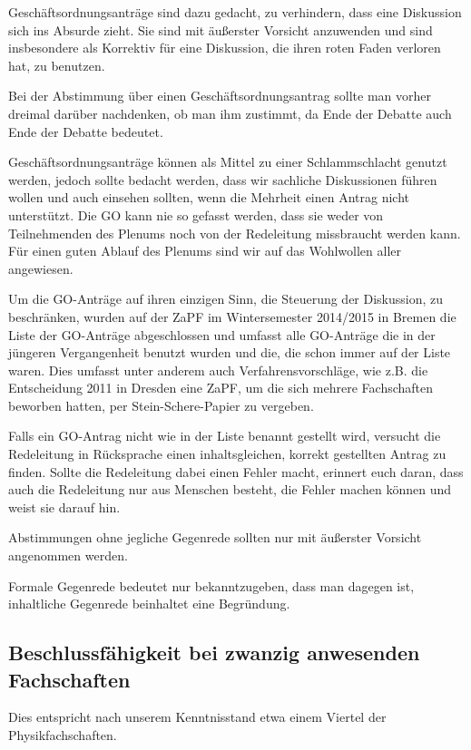 \documentclass[12pt,oneside]{scrartcl}
\begin{document}
Geschäftsordnungsanträge sind dazu gedacht, zu verhindern, dass eine Diskussion
sich ins Absurde zieht. Sie sind mit äußerster Vorsicht anzuwenden und sind
insbesondere als Korrektiv für eine Diskussion, die ihren roten Faden verloren
hat, zu benutzen.

Bei der Abstimmung über einen Geschäftsordnungsantrag sollte man vorher dreimal
darüber nachdenken, ob man ihm zustimmt, da Ende der Debatte auch Ende der Debatte
bedeutet.

Geschäftsordnungsanträge können als Mittel zu einer Schlammschlacht genutzt
werden, jedoch sollte bedacht werden, dass wir sachliche Diskussionen führen
wollen und auch einsehen sollten, wenn die Mehrheit einen Antrag nicht
unterstützt. Die GO kann nie so gefasst werden, dass sie weder von Teilnehmenden
des Plenums noch von der Redeleitung missbraucht werden kann. Für einen guten
Ablauf des Plenums sind wir auf das Wohlwollen aller angewiesen.

Um die GO-Anträge auf ihren einzigen Sinn, die Steuerung der Diskussion, zu
beschränken, wurden auf der ZaPF im Wintersemester 2014/2015 in Bremen die Liste
der GO-Anträge abgeschlossen und umfasst alle GO-Anträge die in der jüngeren
Vergangenheit benutzt wurden und die, die schon immer auf der Liste waren.
Dies umfasst unter anderem auch Verfahrensvorschläge,
wie z.B. die Entscheidung 2011 in Dresden eine ZaPF, um die sich mehrere
Fachschaften beworben hatten, per Stein-Schere-Papier zu vergeben.

Falls ein GO-Antrag nicht wie in der Liste benannt gestellt wird, versucht die
Redeleitung in Rücksprache einen inhaltsgleichen, korrekt gestellten Antrag zu
finden. Sollte die Redeleitung dabei einen Fehler macht, erinnert euch daran,
dass auch die Redeleitung nur aus Menschen besteht, die Fehler machen können und
weist sie darauf hin.

Abstimmungen ohne jegliche Gegenrede sollten nur mit äußerster Vorsicht
angenommen werden.

Formale Gegenrede bedeutet nur bekanntzugeben, dass man dagegen ist, inhaltliche
Gegenrede beinhaltet eine Begründung.


\subsection{Beschlussfähigkeit bei zwanzig anwesenden Fachschaften%
  \label{beschlussfahigkeit-bei-zwanzig-anwesenden-fachschaften}%
}

Dies entspricht nach unserem Kenntnisstand etwa einem Viertel der Physikfachschaften.
\end{document}
